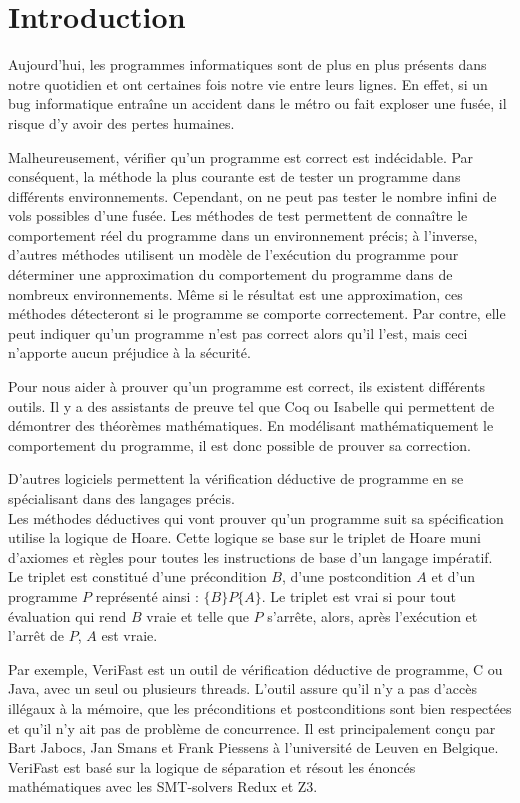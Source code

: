 \documentclass[9pt,openany]{book}
\newcommand{\verifast}{VeriFast}
\begin{document}
\chapter*{Introduction}
		Aujourd'hui, les programmes informatiques sont de plus en plus pr\'esents dans notre quotidien et ont certaines fois notre vie entre leurs lignes. En effet, si un bug informatique entra\^ine un accident dans le m\'etro ou fait exploser une fus\'ee, il risque d'y avoir des pertes humaines. \par
		Malheureusement, v\'erifier qu'un programme est correct est ind\'ecidable. Par cons\'equent, la m\'ethode la plus courante est de tester un programme dans diff\'erents environnements. Cependant, on ne peut pas tester le nombre infini de vols possibles d'une fus\'ee. Les m\'ethodes de test permettent de conna\^itre le comportement r\'eel du programme dans un environnement pr\'ecis; \`a l'inverse, d'autres m\'ethodes utilisent un mod\`ele de l'ex\'ecution du programme pour d\'eterminer une approximation du comportement du programme dans de nombreux environnements. M\^eme si le r\'esultat est une approximation, ces m\'ethodes d\'etecteront si le programme se comporte correctement. Par contre, elle peut indiquer qu'un programme n'est pas correct alors qu'il l'est, mais ceci n'apporte aucun pr\'ejudice \`a la s\'ecurit\'e.
\par 

		Pour nous aider \`a prouver qu'un programme est correct, ils existent diff\'erents outils. Il y a des assistants de preuve tel que Coq ou Isabelle qui permettent de d\'emontrer des th\'eor\`emes math\'ematiques. En mod\'elisant math\'ematiquement le comportement du programme, il est donc possible de prouver sa correction. \par
		
	D'autres logiciels permettent la v\'erification d\'eductive de programme en se sp\'ecialisant dans des langages pr\'ecis. \\Les m\'ethodes d\'eductives qui vont prouver qu'un programme suit sa sp\'ecification utilise la logique de Hoare. Cette logique se base sur le triplet de Hoare muni d'axiomes et r\`egles pour toutes les instructions de base d'un langage imp\'eratif. Le triplet est constitu\'e d'une pr\'econdition $B$, d'une postcondition $A$ et d'un programme $P$ repr\'esent\'e ainsi : $\{B\}P\{A\}$. Le triplet est vrai si pour tout \'evaluation qui rend $B$ vraie et telle que $P$ s'arr\^ete, alors, apr\`es l'ex\'ecution et l'arr\^et de $P$, $A$ est vraie.\par Par exemple, \verifast{} est un outil de v\'erification d\'eductive de programme, C ou Java, avec un seul ou plusieurs threads. L'outil assure qu'il n'y a pas d'acc\`es ill\'egaux \`a la m\'emoire, que les pr\'econditions et postconditions sont bien respect\'ees et qu'il n'y ait pas de probl\`eme de concurrence. Il est principalement con\c{c}u par Bart Jabocs, Jan Smans et Frank Piessens \`a l'universit\'e de Leuven en Belgique. \verifast{} est bas\'e sur la logique de s\'eparation et r\'esout les \'enonc\'es math\'ematiques avec les SMT-solvers Redux et Z3.\par
	
\end{document}
